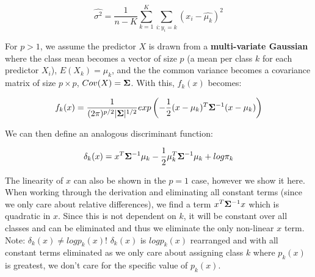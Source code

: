 $$ \hat{\sigma^{2}} = \frac{1}{n-K} \sum_{k=1}^{K} \sum_{i:y_{i}=k} (x_{i} - \hat{\mu_{k}})^{2} $$

For $p>1$, we assume the predictor $X$ is drawn from a \textbf{multi-variate Gaussian} where the class mean becomes a vector of size $p$ (a mean per class $k$ for each predictor $X_{i}$), $E(X_{k})=\mu_{k}$, and the the common variance becomes a covariance matrix of size $p\times p$, $Cov(X)=\mathbf{\Sigma}$. With this, $f_{k}(x)$ becomes:

$$ f_{k}(x) = \frac{1}{(2\pi)^{p/2}|\mathbf{\Sigma}|^{1/2}}exp \left( -\frac{1}{2}(x-\mu_{k})^{T}\mathbf{\Sigma}^{-1}(x-\mu_{k}) \right) $$

We can then define an analogous discriminant function:

$$ \delta_{k}(x) = x^{T}\mathbf{\Sigma}^{-1}\mu_{k}-\frac{1}{2}\mu_{k}^{T}\mathbf{\Sigma}^{-1}\mu_{k} + log\pi_{k} $$

The linearity of $x$ can also be shown in the $p=1$ case, however we show it here. When working through the derivation and eliminating all constant terms (since we only care about relative differences), we find a term $x^{T}\mathbf{\Sigma}^{-1}x$ which is quadratic in $x$. Since this is not dependent on $k$, it will be constant over all classes and can be eliminated and thus we eliminate the only non-linear $x$ term. Note: $\delta_{k}(x) \neq log p_{k}(x)$! $\delta_{k}(x)$ is $log p_{k}(x)$ rearranged and with all constant terms eliminated as we only care about assigning class $k$ where $p_{k}(x)$ is greatest, we don't care for the specific value of $p_{k}(x)$.
